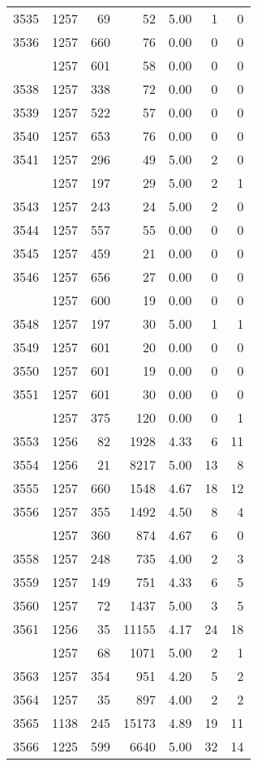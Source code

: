 \documentclass[
]{article}
\begin{document}
\begin{table}
\begin{tabular}[t]{lrrrrrr}
3535 & 1257 & 69 & 52 & 5.00 & 1 & 0\\
3536 & 1257 & 660 & 76 & 0.00 & 0 & 0\\
\addlinespace
3537 & 1257 & 601 & 58 & 0.00 & 0 & 0\\
3538 & 1257 & 338 & 72 & 0.00 & 0 & 0\\
3539 & 1257 & 522 & 57 & 0.00 & 0 & 0\\
3540 & 1257 & 653 & 76 & 0.00 & 0 & 0\\
3541 & 1257 & 296 & 49 & 5.00 & 2 & 0\\
\addlinespace
3542 & 1257 & 197 & 29 & 5.00 & 2 & 1\\
3543 & 1257 & 243 & 24 & 5.00 & 2 & 0\\
3544 & 1257 & 557 & 55 & 0.00 & 0 & 0\\
3545 & 1257 & 459 & 21 & 0.00 & 0 & 0\\
3546 & 1257 & 656 & 27 & 0.00 & 0 & 0\\
\addlinespace
3547 & 1257 & 600 & 19 & 0.00 & 0 & 0\\
3548 & 1257 & 197 & 30 & 5.00 & 1 & 1\\
3549 & 1257 & 601 & 20 & 0.00 & 0 & 0\\
3550 & 1257 & 601 & 19 & 0.00 & 0 & 0\\
3551 & 1257 & 601 & 30 & 0.00 & 0 & 0\\
\addlinespace
3552 & 1257 & 375 & 120 & 0.00 & 0 & 1\\
3553 & 1256 & 82 & 1928 & 4.33 & 6 & 11\\
3554 & 1256 & 21 & 8217 & 5.00 & 13 & 8\\
3555 & 1257 & 660 & 1548 & 4.67 & 18 & 12\\
3556 & 1257 & 355 & 1492 & 4.50 & 8 & 4\\
\addlinespace
3557 & 1257 & 360 & 874 & 4.67 & 6 & 0\\
3558 & 1257 & 248 & 735 & 4.00 & 2 & 3\\
3559 & 1257 & 149 & 751 & 4.33 & 6 & 5\\
3560 & 1257 & 72 & 1437 & 5.00 & 3 & 5\\
3561 & 1256 & 35 & 11155 & 4.17 & 24 & 18\\
\addlinespace
3562 & 1257 & 68 & 1071 & 5.00 & 2 & 1\\
3563 & 1257 & 354 & 951 & 4.20 & 5 & 2\\
3564 & 1257 & 35 & 897 & 4.00 & 2 & 2\\
3565 & 1138 & 245 & 15173 & 4.89 & 19 & 11\\
3566 & 1225 & 599 & 6640 & 5.00 & 32 & 14\\

\end{tabular}
\end{table}
\end{document}
